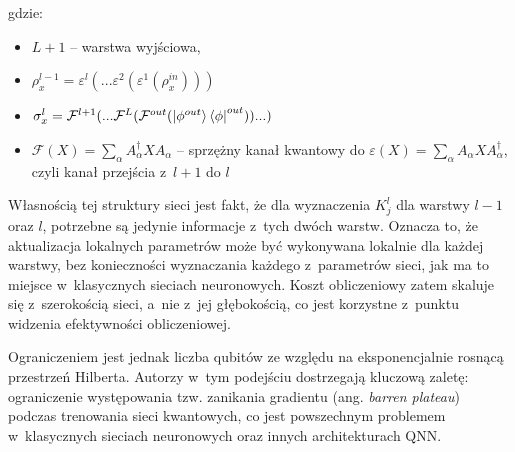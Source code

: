 gdzie:
\begin{itemize}
    \item $L+1$ -- warstwa wyjściowa,
    \item $\rho_x^{l-1}=\varepsilon^l(...\varepsilon^2(\varepsilon^1(\rho_x^{in})))$
    \item $\sigma_x^l =\mathcal{F}^{l+1}(...\mathcal{F}^L(\mathcal{F}^{out}(\ket{\phi^{out}}\bra{\phi}^{out}))...) $
    \item $\mathcal{F}(X) = \sum_{\alpha}A_{\alpha}^{\dagger}XA_{\alpha}$ -- sprzężny kanał kwantowy do $\varepsilon(X)=\sum_{\alpha}A_{\alpha}XA_{\alpha}^{\dagger}$, czyli kanał przejścia z~$l+1$ do $l$
\end{itemize}

Własnością tej struktury sieci jest fakt, że dla wyznaczenia $K_j^l$ dla warstwy $l-1$ oraz $l$, potrzebne są jedynie informacje z~tych dwóch warstw. Oznacza to, że aktualizacja lokalnych parametrów może być wykonywana lokalnie dla każdej warstwy, bez konieczności wyznaczania każdego z~parametrów sieci, jak ma to miejsce w~klasycznych sieciach neuronowych. Koszt obliczeniowy zatem skaluje się z~szerokością sieci, a~nie z~jej głębokością, co jest korzystne z~punktu widzenia efektywności obliczeniowej.

Ograniczeniem jest jednak liczba qubitów ze względu na eksponencjalnie rosnącą przestrzeń Hilberta. Autorzy w~tym podejściu dostrzegają kluczową zaletę: ograniczenie występowania tzw. zanikania gradientu (ang. \textit{barren plateau}) podczas trenowania sieci kwantowych, co jest powszechnym problemem w~klasycznych sieciach neuronowych oraz innych architekturach QNN.

